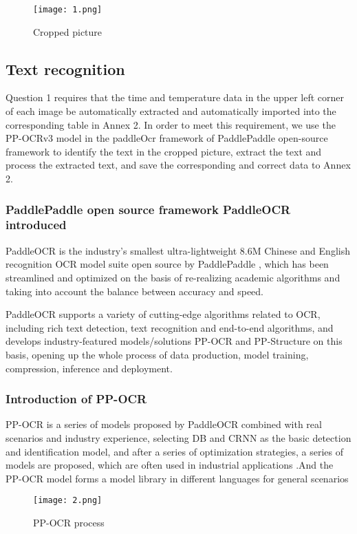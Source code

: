 \documentclass[12pt]{apmcmthesis}
\begin{document}
\begin{figure}[htbp]
	\centering
	\texttt{[image: 1.png]}
	\caption{Cropped picture}
	\label{a}
\end{figure}


\subsection{Text recognition}
\setlength{\parindent}{2em} Question 1 requires that the time and temperature data in the upper left corner of each image be automatically extracted and automatically imported into the corresponding table in Annex 2. In order to meet this requirement, we use the PP-OCRv3 model in the paddleOcr framework of PaddlePaddle open-source framework to identify the text in the cropped picture, extract the text and process the extracted text, and save the corresponding and correct data to Annex 2.
\subsubsection{PaddlePaddle open source framework PaddleOCR introduced}
\setlength{\parindent}{2em}PaddleOCR \cite{1}is the industry's smallest ultra-lightweight 8.6M Chinese and English recognition OCR model suite open source by PaddlePaddle , which has been streamlined and optimized on the basis of re-realizing academic algorithms and taking into account the balance between accuracy and speed.

\setlength{\parindent}{2em}PaddleOCR supports a variety of cutting-edge algorithms related to OCR, including rich text detection, text recognition and end-to-end algorithms, and develops industry-featured models/solutions PP-OCR and PP-Structure on this basis, opening up the whole process of data production, model training, compression, inference and deployment.
\subsubsection{Introduction of PP-OCR}
\setlength{\parindent}{2em}PP-OCR is a series of models proposed by PaddleOCR combined with real scenarios and industry experience, selecting DB \cite{2}and CRNN \cite{3} as the basic detection and identification model, and after a series of optimization strategies, a series of models are proposed, which are often used in industrial applications .And the PP-OCR model forms a model library in different languages for general scenarios

\begin{figure}[htbp]
	\centering
	\texttt{[image: 2.png]}
	\caption{PP-OCR process}
	\label{a}
\end{figure}
\end{document}
